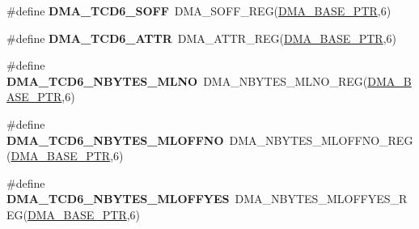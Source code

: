 \begin{DoxyCompactItemize}
\item 
\hypertarget{group___d_m_a___register___accessor___macros_gac85de51a9a8986d8268f7f1f27bfb00f}{}\#define {\bfseries D\+M\+A\+\_\+\+T\+C\+D6\+\_\+\+S\+O\+F\+F}~D\+M\+A\+\_\+\+S\+O\+F\+F\+\_\+\+R\+E\+G(\hyperlink{group___d_m_a___peripheral_ga6997fbc1b1973e9f27170217a3bd6f22}{D\+M\+A\+\_\+\+B\+A\+S\+E\+\_\+\+P\+T\+R},6)\label{group___d_m_a___register___accessor___macros_gac85de51a9a8986d8268f7f1f27bfb00f}

\item 
\hypertarget{group___d_m_a___register___accessor___macros_ga0bce2367a1fe49658e389384bede7937}{}\#define {\bfseries D\+M\+A\+\_\+\+T\+C\+D6\+\_\+\+A\+T\+T\+R}~D\+M\+A\+\_\+\+A\+T\+T\+R\+\_\+\+R\+E\+G(\hyperlink{group___d_m_a___peripheral_ga6997fbc1b1973e9f27170217a3bd6f22}{D\+M\+A\+\_\+\+B\+A\+S\+E\+\_\+\+P\+T\+R},6)\label{group___d_m_a___register___accessor___macros_ga0bce2367a1fe49658e389384bede7937}

\item 
\hypertarget{group___d_m_a___register___accessor___macros_ga5df3e27b1d307f3799a0518af5e77b5d}{}\#define {\bfseries D\+M\+A\+\_\+\+T\+C\+D6\+\_\+\+N\+B\+Y\+T\+E\+S\+\_\+\+M\+L\+N\+O}~D\+M\+A\+\_\+\+N\+B\+Y\+T\+E\+S\+\_\+\+M\+L\+N\+O\+\_\+\+R\+E\+G(\hyperlink{group___d_m_a___peripheral_ga6997fbc1b1973e9f27170217a3bd6f22}{D\+M\+A\+\_\+\+B\+A\+S\+E\+\_\+\+P\+T\+R},6)\label{group___d_m_a___register___accessor___macros_ga5df3e27b1d307f3799a0518af5e77b5d}

\item 
\hypertarget{group___d_m_a___register___accessor___macros_ga665fe503506ca6d695a7b3520579678f}{}\#define {\bfseries D\+M\+A\+\_\+\+T\+C\+D6\+\_\+\+N\+B\+Y\+T\+E\+S\+\_\+\+M\+L\+O\+F\+F\+N\+O}~D\+M\+A\+\_\+\+N\+B\+Y\+T\+E\+S\+\_\+\+M\+L\+O\+F\+F\+N\+O\+\_\+\+R\+E\+G(\hyperlink{group___d_m_a___peripheral_ga6997fbc1b1973e9f27170217a3bd6f22}{D\+M\+A\+\_\+\+B\+A\+S\+E\+\_\+\+P\+T\+R},6)\label{group___d_m_a___register___accessor___macros_ga665fe503506ca6d695a7b3520579678f}

\item 
\hypertarget{group___d_m_a___register___accessor___macros_ga18f055c822e10a2c8cfdcddd8bdc61bc}{}\#define {\bfseries D\+M\+A\+\_\+\+T\+C\+D6\+\_\+\+N\+B\+Y\+T\+E\+S\+\_\+\+M\+L\+O\+F\+F\+Y\+E\+S}~D\+M\+A\+\_\+\+N\+B\+Y\+T\+E\+S\+\_\+\+M\+L\+O\+F\+F\+Y\+E\+S\+\_\+\+R\+E\+G(\hyperlink{group___d_m_a___peripheral_ga6997fbc1b1973e9f27170217a3bd6f22}{D\+M\+A\+\_\+\+B\+A\+S\+E\+\_\+\+P\+T\+R},6)\label{group___d_m_a___register___accessor___macros_ga18f055c822e10a2c8cfdcddd8bdc61bc}


\end{DoxyCompactItemize}
